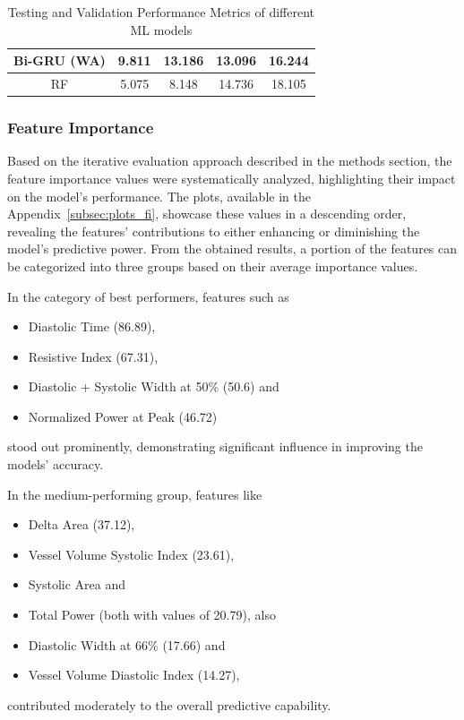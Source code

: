 \begin{table}[!]
\begin{center}
\begin{tabular}{ |c|c|c|c|c| }
            \hline
            Bi-GRU (WA)  & 9.811                     & 13.186                     & \cellcolor{green!20}13.096 & \cellcolor{green!20}16.244 \\
            \hline
            RF           & \cellcolor{green!30}5.075 & \cellcolor{green!30}8.148  & 14.736                     & 18.105                     \\
            \hline
        \end{tabular}
    \end{center}
    \captionsetup{format=plain, justification=centering, font=small}
    \vspace{-0.5cm}
    \caption{Testing and Validation Performance Metrics of different ML models}
    \label{tab:test_validate_rmse_mae}
\end{table}

\newpage

\subsubsection{Feature Importance}
\label{subsubsec:feature_importance}

Based on the iterative evaluation approach described in the methods section, the feature importance values were systematically analyzed, highlighting their impact on the model's performance.
The plots, available in the Appendix~\ref{subsec:plots_fi}, showcase these values in a descending order, revealing the features' contributions to either enhancing or diminishing the model's predictive power.
From the obtained results, a portion of the features can be categorized into three groups based on their average importance values.

In the category of best performers, features such as
\begin{itemize}[itemsep=2pt]
    \item Diastolic Time (86.89),
    \item Resistive Index (67.31),
    \item Diastolic + Systolic Width at 50\% (50.6) and
    \item Normalized Power at Peak (46.72)
\end{itemize}
stood out prominently, demonstrating significant influence in improving the models' accuracy.

In the medium-performing group, features like
\begin{itemize}[itemsep=2pt]
    \item Delta Area (37.12),
    \item Vessel Volume Systolic Index (23.61),
    \item Systolic Area and
    \item Total Power (both with values of 20.79), also
    \item Diastolic Width at 66\% (17.66) and
    \item Vessel Volume Diastolic Index (14.27),
\end{itemize}
contributed moderately to the overall predictive capability.

